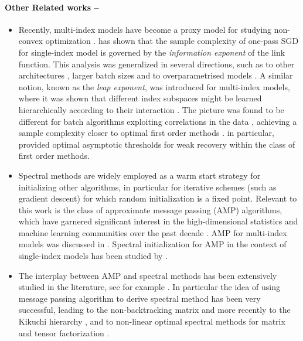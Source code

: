 \paragraph{Other Related works --}
\begin{itemize}[leftmargin=2em,wide=1pt]
    \item Recently, multi-index models have become a proxy model for studying non-convex optimization \cite{veiga2022phase, arnaboldi2023high, collins2024hitting}. \cite{arous2021online} has shown that the sample complexity of one-pass SGD for single-index model is governed by the \emph{information exponent} of the link function. This analysis was generalized in several directions, such as to other architectures \cite{berthier2024learning}, larger batch sizes \cite{arnaboldi2024online} and to overparametrised models \cite{arnaboldi2024escaping}. A similar notion, known as the \emph{leap exponent}, was introduced for multi-index models, where it was shown that different index subspaces might be learned hierarchically according to their interaction \cite{abbe2022merged, abbe2023sgd, bietti2023, mousavihosseini2024}. The picture was found to be  different for batch algorithms exploiting correlations in the data \cite{dandi2024benefits, arnaboldi2024repetita, lee2024neural}, achieving a sample complexity closer to optimal first order methods \cite{Barbier2019, damian24a, troiani2024fundamental}. \cite{troiani2024fundamental} in particular, provided optimal asymptotic thresholds for weak recovery within the class of first order methods.
    
    \item Spectral methods are widely employed as a warm start strategy for initializing other algorithms, in particular for iterative schemes (such as gradient descent) for which random initialization is a fixed point. Relevant to this work is the class of approximate message passing (AMP) algorithms, which have garnered significant interest in the high-dimensional statistics and machine learning communities over the past decade \cite{donoho2009message,Bayati2011,rangan2011generalized,fletcher2018iterative}. AMP for multi-index models was discussed in \cite{aubin2018committee, troiani2024fundamental}. Spectral initialization for AMP in the context of single-index models has been studied by \cite{mondelli21a}.  
    
    \item The interplay between AMP and spectral methods has been extensively studied in the literature, see for example \cite{saade2014spectral,lesieur2017constrained,aubin2019spiked,mondelli18a,Mondelli2022,maillard22a,venkataramanan2022estimation}. In particular the idea of using message passing algorithm to derive spectral method has been very successful, leading to the non-backtracking matrix \cite{krzakala2013spectral} and more recently to the Kikuchi hierarchy \cite{wein2019kikuchi,hsieh2023simple}, and to non-linear optimal spectral methods for matrix and tensor factorization \cite{lesieur2017constrained,perry2018optimality,guionnet2023spectral,pak2024optimal}. 
\end{itemize}









